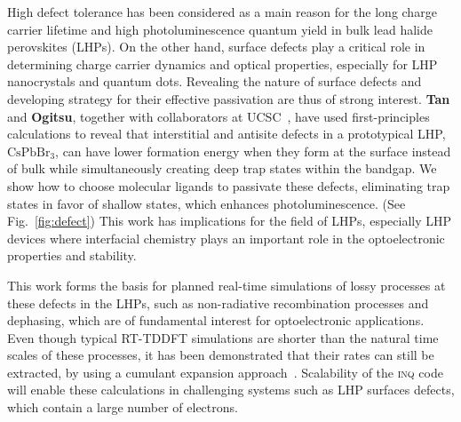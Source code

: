 High defect tolerance has been considered as a main reason for the long charge carrier lifetime and high photoluminescence quantum yield in bulk lead halide perovskites (LHPs). 
On the other hand, surface defects play a critical role in determining charge carrier dynamics and optical properties, especially for LHP nanocrystals and quantum dots. Revealing the nature of surface defects and developing strategy for their effective passivation are thus of strong interest. 
{\bf Tan} and {\bf Ogitsu}, together with collaborators at UCSC~\cite{Smart2021}, have used first-principles calculations to reveal that interstitial and antisite defects in a prototypical LHP, \(\mathrm{CsPbBr_3}\), can have lower formation energy when they form at the surface instead of bulk while simultaneously creating deep trap states within the bandgap.
We show how to choose molecular ligands to passivate these defects, eliminating trap states in favor of shallow states, which enhances photoluminescence. 
(See Fig.~\ref{fig:defect}) This work has implications for  the field of LHPs, especially LHP devices where interfacial chemistry plays an important role in the optoelectronic properties and stability.

This work forms the basis for planned real-time simulations of lossy processes at these defects in the LHPs, such as non-radiative recombination processes and dephasing, which are of fundamental interest for optoelectronic applications. 
Even though typical RT-TDDFT simulations are shorter than the natural time scales of these processes, it has been demonstrated that their rates can still be extracted, by using a cumulant expansion approach~\cite{Qiao2020}. 
Scalability of the \textsc{inq} code will enable these calculations in challenging systems such as LHP surfaces defects, which contain a large number of electrons.     

